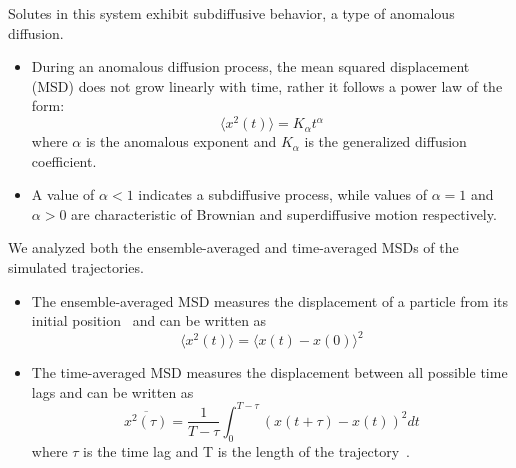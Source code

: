 \documentclass{article}
\begin{document}
  Solutes in this system exhibit subdiffusive behavior, a type of anomalous diffusion.
  \begin{itemize}
  	\item During an anomalous diffusion process, the mean squared displacement (MSD)
  	does not grow linearly with time, rather it follows a power law of the form:
	\begin{equation} 
	\langle x^2(t) \rangle = K_{\alpha}t^\alpha
	\label{eqn:msd_form}
	\end{equation} 
	where $\alpha$ is the anomalous exponent and $K_\alpha$ is the
	generalized diffusion coefficient.
	\item A value of $\alpha < 1$ indicates a subdiffusive process, while values of
	$\alpha = 1$ and $\alpha > 0$ are characteristic of Brownian and superdiffusive
	motion respectively.
  \end{itemize}

  \noindent We analyzed both the ensemble-averaged and time-averaged MSDs
  of the simulated trajectories.
  \begin{itemize}
	\item The ensemble-averaged MSD measures the displacement of a particle from its initial
	position~\cite{meroz_toolbox_2015} and can be written as
	\begin{equation}
	\langle x^2(t) \rangle = \langle x(t) - x(0) \rangle^2
	\label{eqn:ensemble_msd}
	\end{equation}
	\item The time-averaged MSD measures the displacement between all possible time lags
	and can be written as
	\begin{equation}
	\overline{x^2(\tau)} = \dfrac{1}{T - \tau}\int_{0}^{T - \tau} (x(t + \tau) - x(t))^2 dt
	\end{equation}
	where $\tau$ is the time lag and T is the length of the
	trajectory~\cite{meroz_toolbox_2015}. 
  \end{itemize}
  
\end{document}
